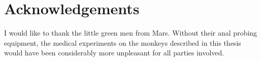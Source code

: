 \chapter*{Acknowledgements}

I would like to thank the little green men from Mars. Without their anal probing equipment, the medical experiments on the monkeys described in this thesis would have been considerably more unpleasant for all parties involved.

\clearpage
